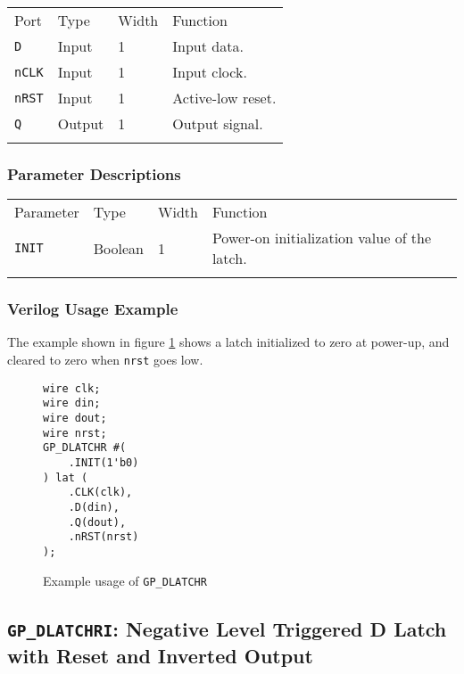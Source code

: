 \documentclass[11pt]{article}
\newcommand{\tokenstyle}[1]{\texttt{#1}}
\newcommand{\wirestyle}[1]{\texttt{#1}}
\newcommand{\whenstyle}[1]{{\fontseries{sb}\selectfont#1}}
\newcommand{\thinhline}{\Xhline{1\arrayrulewidth}}
\newcommand{\thickhline}{\Xhline{2.5\arrayrulewidth}}
\begin{document}
\begin{tabularx}{\textwidth}{lllX}
\thinhline
\whenstyle{Port} & \whenstyle{Type} & \whenstyle{Width} & \whenstyle{Function} \\
\thickhline
\tokenstyle{D} & Input & 1 & Input data. \\
\thinhline
\tokenstyle{nCLK} & Input & 1 & Input clock. \\
\thinhline
\tokenstyle{nRST} & Input & 1 & Active-low reset. \\
\thinhline
\tokenstyle{Q} & Output & 1 & Output signal. \\
\thinhline
\end{tabularx}

\subsubsection{Parameter Descriptions}

\begin{tabularx}{\textwidth}{lllX}
\thinhline
\whenstyle{Parameter} & \whenstyle{Type} & \whenstyle{Width} & \whenstyle{Function} \\
\thickhline
\tokenstyle{INIT} & Boolean & 1 & Power-on initialization value of the latch.\\
\thinhline
\end{tabularx}

\subsubsection{Verilog Usage Example}

The example shown in figure \ref{gp-dlatchr-example} shows a latch initialized to zero at power-up, and cleared to zero
when \wirestyle{nrst} goes low.

\begin{figure}[h]
\begin{lstlisting}
wire clk;
wire din;
wire dout;
wire nrst;
GP_DLATCHR #(
	.INIT(1'b0)
) lat (
	.CLK(clk),
	.D(din),
	.Q(dout),
	.nRST(nrst)
);
\end{lstlisting}
\caption{Example usage of \tokenstyle{GP\_DLATCHR}}
\label{gp-dlatchr-example}
\end{figure}


\pagebreak
\subsection{\tokenstyle{GP\_DLATCHRI}: Negative Level Triggered D Latch with Reset and Inverted Output}
\label{gp-latchri}
\end{document}
